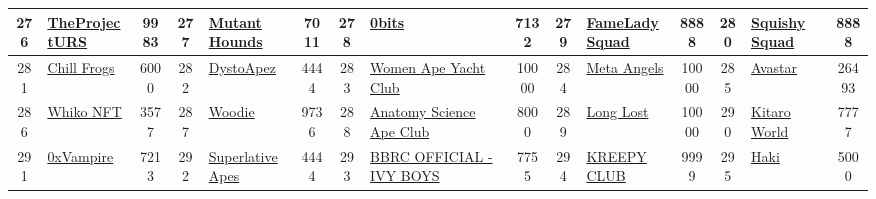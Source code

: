 \begin{table*}[]
{\begin{tabular}{|c|l|c|c|l|c|c|l|c|c|l|c|c|l|c|}
        276   & \href{https://ursproject.io/}{TheProjectURS}                                       & 9983              & 277   & \href{https://opensea.io/collection/mutant-hounds}{Mutant Hounds}                                 & 7011              & 278   & \href{https://obitsnft.com}{0bits}                                                & 7132              & 279   & \href{https://www.fameladysquad.com/}{FameLadySquad}                          & 8888              & 280   & \href{http://www.squishysquadnft.com}{Squishy Squad}                                      & 8888                                    \\ \hline
        281   & \href{http://chillfrogs.io}{Chill Frogs}                                           & 6000              & 282   & \href{https://www.dysto.inc/}{DystoApez}                                                          & 4444              & 283   & \href{https://mint.womenapeyachtclub.com/}{Women Ape Yacht Club}                  & 10000             & 284   & \href{https://www.metaangelsnft.com/}{Meta Angels}                            & 10000             & 285   & \href{https://avastars.io/}{Avastar}                                                      & 26493                                   \\ \hline
        286   & \href{https://whiko.io/}{Whiko NFT}                                                & 3577              & 287   & \href{http://woodiesofficial.com}{Woodie}                                                         & 9736              & 288   & \href{https://anatomyscienceapeclub.com}{Anatomy Science Ape Club}                & 8000              & 289   & \href{https://thelonglost.io}{Long Lost}                                      & 10000             & 290   & \href{https://kitaro.world}{Kitaro World}                                                 & 7777                                    \\ \hline
        291   & \href{https://0xvampire.com/}{0xVampire}                                           & 7213              & 292   & \href{http://www.superlativeapes.com}{Superlative Apes}                                           & 4444              & 293   & \href{http://bbrc.io}{BBRC OFFICIAL - IVY BOYS}                                   & 7755              & 294   & \href{https://kreepyclub.io/}{KREEPY CLUB}                                    & 9999              & 295   & \href{https://opensea.io/collection/hakinft-io}{Haki}                                     & 5000                                    \\ \hline

\end{tabular}}
\end{table*}
